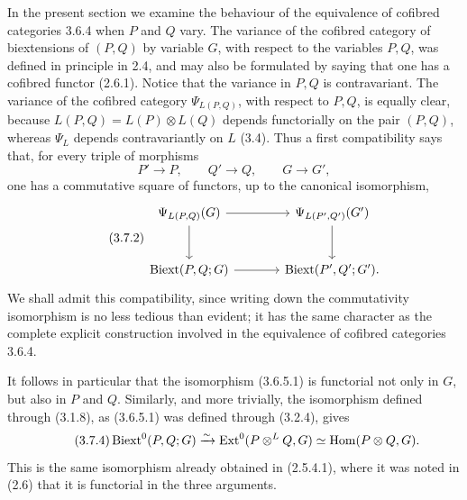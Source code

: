 \documentclass[11pt]{article}
\providecommand{\Hom}{\operatorname{Hom}}
\providecommand{\Ext}{\operatorname{Ext}}
\begin{document}
In the present section we examine the behaviour of the equivalence of cofibred categories 3.6.4 when \(P\) and \(Q\) vary.  The variance of the cofibred category of biextensions of \((P,Q)\) by variable \(G\), with respect to the variables \(P,Q\), was defined in principle in 2.4, and may also be formulated by saying that one has a cofibred functor (2.6.1).  Notice that the variance in \(P,Q\) is contravariant.  The variance of the cofibred category \(\Psi_{L(P,Q)}\), with respect to \(P,Q\), is equally clear, because \(L(P,Q)=L(P)\otimes L(Q)\) depends functorially on the pair \((P,Q)\), whereas \(\Psi_L\) depends contravariantly on \(L\) (3.4).  Thus a first compatibility says that, for every triple of morphisms
\begin{equation}\tag{3.7.1}
        P'\longrightarrow P,
        \qquad Q'\longrightarrow Q,
        \qquad G\longrightarrow G',
\end{equation}
one has a commutative square of functors, up to the canonical isomorphism,
\begin{equation}\tag{3.7.2}
\begin{tikzcd}[column sep=large,row sep=large]
 \Psi_{L(P,Q)}(G) \arrow[r] \arrow[d] & \Psi_{L(P',Q')}(G') \arrow[d] \\
 \Biext(P,Q;G) \arrow[r] & \Biext(P',Q';G').
\end{tikzcd}
\end{equation}
We shall admit this compatibility, since writing down the commutativity isomorphism is no less tedious than evident; it has the same character as the complete explicit construction involved in the equivalence of cofibred categories 3.6.4.

It follows in particular that the isomorphism (3.6.5.1) is functorial not only in \(G\), but also in \(P\) and \(Q\).  Similarly, and more trivially, the isomorphism defined through (3.1.8), as (3.6.5.1) was defined through (3.2.4), gives
\begin{equation}\tag{3.7.4}
 \Biext^0(P,Q;G)\xrightarrow{\sim}
 \Ext^0(P\otimes^L Q,G)\simeq \Hom(P\otimes Q,G).
\end{equation}
This is the same isomorphism already obtained in (2.5.4.1), where it was noted in (2.6) that it is functorial in the three arguments.
\end{document}

